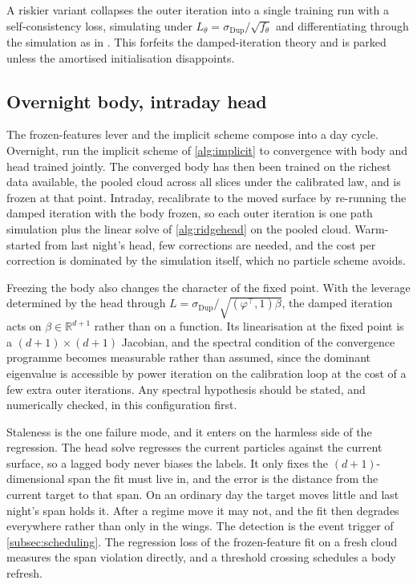 \documentclass[11pt,a4paper]{article}
\theoremstyle{plain}
\theoremstyle{definition}
\theoremstyle{definition}
\newcommand{\R}{\mathbb{R}}
\newcommand{\sigDup}{\sigma_{\mathrm{Dup}}}
\newcommand{\Lev}{L}
\begin{document}
A riskier variant collapses the outer iteration into a single training run with a self-consistency loss, simulating under $\Lev_\theta = \sigDup/\sqrt{f_\theta}$ and differentiating through the simulation as in \citet{cuchiero2020}. This forfeits the damped-iteration theory and is parked unless the amortised initialisation disappoints.

\subsection{Overnight body, intraday head}\label{subsec:overnightbody}

The frozen-features lever and the implicit scheme compose into a day cycle. Overnight, run the implicit scheme of \cref{alg:implicit} to convergence with body and head trained jointly. The converged body has then been trained on the richest data available, the pooled cloud across all slices under the calibrated law, and is frozen at that point. Intraday, recalibrate to the moved surface by re-running the damped iteration with the body frozen, so each outer iteration is one path simulation plus the linear solve of \cref{alg:ridgehead} on the pooled cloud. Warm-started from last night's head, few corrections are needed, and the cost per correction is dominated by the simulation itself, which no particle scheme avoids.

Freezing the body also changes the character of the fixed point. With the leverage determined by the head through $\Lev = \sigDup/\sqrt{(\varphi^{\top}, 1)\beta}$, the damped iteration acts on $\beta \in \R^{d+1}$ rather than on a function. Its linearisation at the fixed point is a $(d{+}1)\times(d{+}1)$ Jacobian, and the spectral condition of the convergence programme becomes measurable rather than assumed, since the dominant eigenvalue is accessible by power iteration on the calibration loop at the cost of a few extra outer iterations. Any spectral hypothesis should be stated, and numerically checked, in this configuration first.

Staleness is the one failure mode, and it enters on the harmless side of the regression. The head solve regresses the current particles against the current surface, so a lagged body never biases the labels. It only fixes the $(d{+}1)$-dimensional span the fit must live in, and the error is the distance from the current target to that span. On an ordinary day the target moves little and last night's span holds it. After a regime move it may not, and the fit then degrades everywhere rather than only in the wings. The detection is the event trigger of \cref{subsec:scheduling}. The regression loss of the frozen-feature fit on a fresh cloud measures the span violation directly, and a threshold crossing schedules a body refresh.
\end{document}
